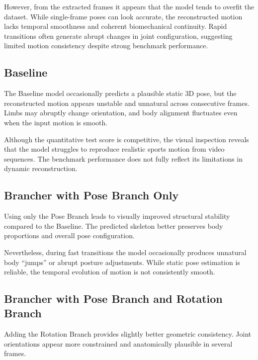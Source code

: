 However, from the extracted frames it appears that the model tends to overfit the dataset. While single-frame poses can look accurate, the reconstructed motion lacks temporal smoothness and coherent 
biomechanical continuity. Rapid transitions often generate abrupt changes in joint configuration, suggesting limited motion consistency despite strong benchmark performance.

\subsection*{Baseline}
The Baseline model occasionally predicts a plausible static 3D pose, but the reconstructed motion appears unstable and unnatural across consecutive frames. Limbs may abruptly change orientation, and body 
alignment fluctuates even when the input motion is smooth.

Although the quantitative test score is competitive, the visual inspection reveals that the model struggles to reproduce realistic sports motion from video sequences. The benchmark performance does not 
fully reflect its limitations in dynamic reconstruction.

\subsection*{Brancher with Pose Branch Only}
Using only the Pose Branch leads to visually improved structural stability compared to the Baseline. The predicted skeleton better preserves body proportions and overall pose configuration.

Nevertheless, during fast transitions the model occasionally produces unnatural body “jumps” or abrupt posture adjustments. While static pose estimation is reliable, the temporal evolution of motion is not 
consistently smooth.

\subsection*{Brancher with Pose Branch and Rotation Branch}
Adding the Rotation Branch provides slightly better geometric consistency. Joint orientations appear more constrained and anatomically plausible in several frames.


